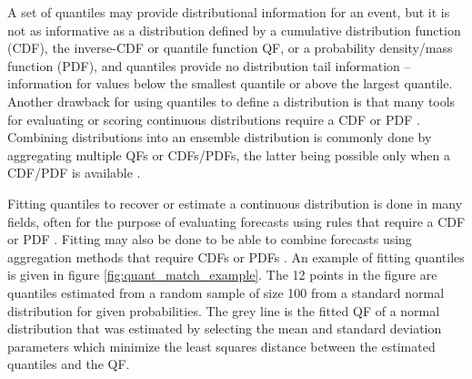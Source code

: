 \documentclass[preprint,12pt,authoryear]{elsarticle}
\begin{document}
A set of quantiles may provide distributional information for an event, but it is not as informative as a distribution defined by a cumulative distribution function (CDF), the inverse-CDF or quantile function QF, or a probability density/mass function (PDF), and quantiles provide no distribution tail information --information for values below the smallest quantile or above the largest quantile. Another drawback for using quantiles to define a distribution is that many tools for evaluating or scoring continuous distributions require a CDF or PDF
\cite[]{gneiting2007strictly,gneiting2014probabilistic}. Combining distributions into an ensemble distribution is commonly 
done by aggregating multiple QFs or 
CDFs/PDFs, the latter being possible only when a CDF/PDF is available \cite[]{gneiting2005calibrated,wang2023forecast}.

Fitting quantiles to recover or estimate a continuous distribution is done in many fields, often for the purpose of evaluating forecasts using rules that require a CDF or PDF \cite[]{simpson2023interpolating, gerding2023evaluating}. Fitting may also be done to be able to combine forecasts using aggregation methods that require CDFs or PDFs \cite[]{gyamerah2020probabilistic,li2019combining,baran2018combining,bogner2017combining,he2016short,gneiting2005calibrated}. An example of fitting quantiles is given in figure \ref{fig:quant_match_example}. The 12 points in the figure are quantiles estimated from a random sample of size 100 from a standard normal distribution for given probabilities. The grey line is the fitted QF of a normal distribution that was estimated by selecting the mean and standard deviation parameters which minimize the least squares distance between the estimated quantiles and the QF.
\end{document}
